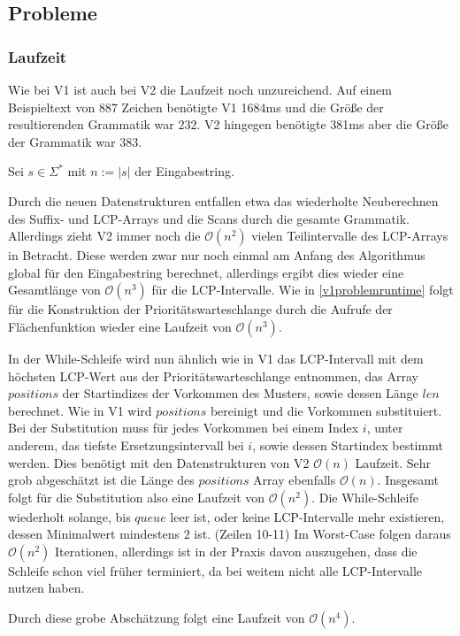 \subsection{Probleme}

\subsubsection{Laufzeit}

Wie bei V1 ist auch bei V2 die Laufzeit noch unzureichend. Auf einem Beispieltext von 887 Zeichen benötigte V1 1684ms und die Größe der resultierenden Grammatik war $232$. V2 hingegen benötigte 381ms aber die Größe der Grammatik war $383$. 

Sei $s \in \Sigma^*$ mit $n := |s|$ der Eingabestring.

Durch die neuen Datenstrukturen entfallen etwa das wiederholte Neuberechnen des Suffix- und LCP-Arrays und die Scans durch die gesamte Grammatik.
Allerdings zieht V2 immer noch die $\mathcal{O}(n^2)$ vielen Teilintervalle des LCP-Arrays in Betracht. Diese werden zwar nur noch einmal am Anfang des Algorithmus global für den Eingabestring berechnet, allerdings ergibt dies wieder eine Gesamtlänge von $\mathcal{O}(n^3)$ für die LCP-Intervalle. Wie in \autoref{v1problemruntime} folgt für die Konstruktion der Prioritätswarteschlange durch die Aufrufe der Flächenfunktion wieder eine Laufzeit von $\mathcal{O}(n^3)$.

In der While-Schleife wird nun ähnlich wie in V1 das LCP-Intervall mit dem höchsten LCP-Wert aus der Prioritätswarteschlange entnommen, das Array $positions$ der Startindizes der Vorkommen des Musters, sowie dessen Länge $len$ berechnet. 
Wie in V1 wird $positions$ bereinigt und die Vorkommen substituiert. Bei der Substitution muss für jedes Vorkommen bei einem Index $i$, unter anderem, das tiefste Ersetzungsintervall bei $i$, sowie dessen Startindex bestimmt werden. 
Dies benötigt mit den Datenstrukturen von V2 $\mathcal{O}(n)$ Laufzeit. Sehr grob abgeschätzt ist die Länge des $positions$ Array ebenfalls $\mathcal{O}(n)$. Insgesamt folgt für die Substitution also eine Laufzeit von $\mathcal{O}(n^2)$. Die While-Schleife wiederholt solange, bis $queue$ leer ist, oder keine LCP-Intervalle mehr existieren, dessen Minimalwert mindestens $2$ ist. (Zeilen 10-11) Im Worst-Case folgen daraus $\mathcal{O}(n^2)$ Iterationen, allerdings ist in der Praxis davon auszugehen, dass die Schleife schon viel früher terminiert, da bei weitem nicht alle LCP-Intervalle nutzen haben.

Durch diese grobe Abschätzung folgt eine Laufzeit von $\mathcal{O}(n^4)$.